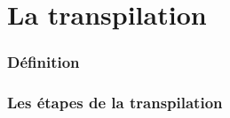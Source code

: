 \section{La transpilation}

\begin{frame}

    \frametitle{Définition \esp}
    
\end{frame}


\begin{frame}


    \frametitle{Les étapes de la transpilation \esp}

   
\end{frame}

